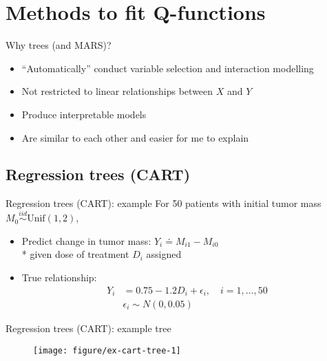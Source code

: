 \documentclass{beamer}
\begin{document}


\section{Methods to fit Q-functions} %
\label{sec:methods_to_fit_q_functions}

\begin{frame}[c]{Why trees (and MARS)?}
  \begin{itemize}[<+->]
    \item ``Automatically'' conduct variable selection and interaction modelling
    \item Not restricted to linear relationships between $X$ and $Y$
    \item Produce interpretable models 
    \item Are similar to each other and easier for me to explain 
  \end{itemize}
\end{frame}

\subsection{Regression trees (CART)} %
\label{sub:cart}

\begin{frame}{Regression trees (CART): example}
  For 50 patients with initial tumor mass $M_{0} \overset{iid}{\sim} \text{Unif}(1, 2)$,
  \begin{itemize}[<+(1)->]
    \item Predict change in tumor mass: $Y_{i} \doteq M_{i1} - M_{i0}$ \\* given dose of treatment $D_{i}$ assigned
    \item True relationship:
    \begin{align*}
      Y_{i} &= 0.75 - 1.2 D_{i} + \epsilon_{i}, \quad i = 1, \ldots, 50 \\
      & \epsilon_{i} \sim N(0, 0.05)
    \end{align*}
  \end{itemize}
\end{frame}

\begin{frame}[c]{Regression trees (CART): example tree}
  \begin{figure}[!htbp]
  \begin{center}
    \texttt{[image: figure/ex-cart-tree-1]}
  \end{center}
  \end{figure}
\end{frame}
\end{document}

